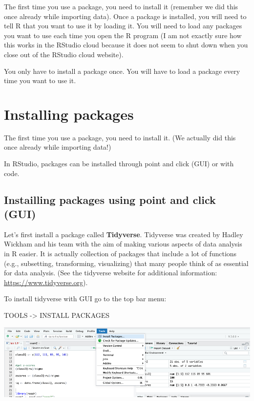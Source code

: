 \documentclass[
]{book}
\begin{document}
The first time you use a package, you need to install it (remember we did this once already while importing data). Once a package is installed, you will need to tell R that you want to use it by loading it. You will need to load any packages you want to use each time you open the R program (I am not exactly sure how this works in the RStudio cloud because it does not seem to shut down when you close out of the RStudio cloud website).

You only have to install a package once. You will have to load a package every time you want to use it.

\hypertarget{installing-packages}{%
\section{Installing packages}\label{installing-packages}}

The first time you use a package, you need to install it. (We actually did this once already while importing data!)

In RStudio, packages can be installed through point and click (GUI) or with code.

\hypertarget{instailling-packages-using-point-and-click-gui}{%
\subsection{Instailling packages using point and click (GUI)}\label{instailling-packages-using-point-and-click-gui}}

Let's first install a package called \textbf{Tidyverse}. Tidyverse was created by Hadley Wickham and his team with the aim of making various aspects of data analysis in R easier. It is actually collection of packages that include a lot of functions (e.g., subsetting, transforming, visualizing) that many people think of as essential for data analysis. (See the tidyverse website for additional information: \url{https://www.tidyverse.org}).

To install tidyverse with GUI go to the top bar menu:

TOOLS -\textgreater{} INSTALL PACKAGES

\includegraphics{img/instpacktools.png}
\end{document}
